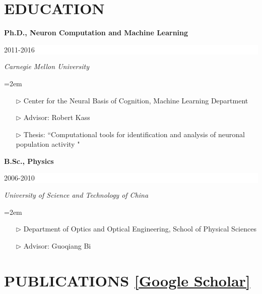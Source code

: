 \documentclass[paper=letter,fontsize=11pt]{scrartcl} %
\newcommand{\sepspace}{\vspace*{1em}}		%
\newcommand{\NewPart}[2]{\section*{\uppercase{#1} #2}}
\newcommand{\EducationEntry}[4]{
		\noindent \textbf{#1} \hfill      %
		\colorbox{White}{%
			\parbox{6em}{%
			\hfill\color{Black}#2}} \par  %
		\noindent \textit{#3} \par        %
		\noindent\hangindent=2em\hangafter=0 \small #4 %
		\normalsize \par}
\begin{document}
\NewPart{Education}{}

\EducationEntry{Ph.D., Neuron Computation and Machine Learning}{2011-2016}{Carnegie Mellon University}
{\begin{itemize}
\item[$\triangleright$]{Center for the Neural Basis of Cognition, Machine Learning Department}
\item[$\triangleright$]{Advisor: Robert Kass}
\item[$\triangleright$] Thesis: ``Computational tools for identification and analysis of neuronal population activity "
\end{itemize}}
\sepspace

\EducationEntry{B.Sc., Physics}{2006-2010}{University of Science and Technology of China}
{\begin{itemize}
\item[$\triangleright$] {Department of Optics and Optical Engineering, School of Physical Sciences}
\item[$\triangleright$] {Advisor: Guoqiang Bi}
\end{itemize}}


\NewPart{Publications}{\href{http://scholar.google.com/citations?hl=en&user=hw0JvzAAAAAJ}{[Google Scholar]}}
\end{document}

